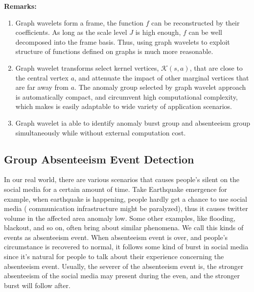 {\textbf{Remarks:}}
\begin{enumerate}
\item Graph wavelets form a frame, the function $f$ can be reconstructed by their coefficients.
As long as the scale level $J$ is high enough, $f$ can be well decomposed into the frame basis. Thus, using graph wavelets to exploit structure of functions defined on graphs is much more reasonable.
\item Graph wavelet transforms select kernel vertices, $\mathcal{K}(s,a)$, that are close to the central vertex $a$, and attenuate the impact of other marginal vertices that are far away from $a$. The anomaly group selected by graph wavelet approach is automatically compact, and circumvent high computational complexity, which makes is easily adaptable to wide variety of application scenarios.
\item Graph wavelet ia able to identify anomaly burst group and absenteeism group simultaneously while without external computation cost.
\end{enumerate}


\subsection{Group Absenteeism Event Detection}
\label{sec:Group Absenteeism Event Detection}
In our real world, there are various scenarios that causes people's silent on the social media for a certain amount of time. Take Earthquake emergence for example, when earthquake is happening, people hardly get a chance to use social media ( communication infrastructure might be paralyzed), thus it causes twitter volume in the affected area anomaly low. Some other examples, like flooding, blackout, and so on, often bring about similar phenomena. We call this kinds of events as absenteeism event. When absenteeism event is over, and people's circumstance is recovered to normal, it follows some kind of burst in social media since it's natural for people to talk about their experience concerning the absenteeism event. Usually, the severer of the absenteeism event is, the stronger absenteeism of the social media may present during the even, and the stronger burst will follow after.

